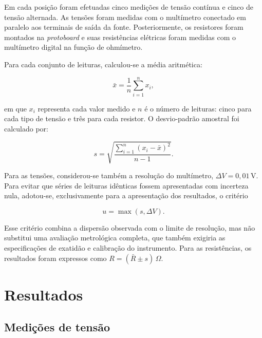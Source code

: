 \documentclass[a4paper,12pt]{article}
\begin{document}
Em cada posição foram efetuadas cinco medições de tensão contínua e cinco de
tensão alternada. As tensões foram medidas com o multímetro conectado em paralelo
aos terminais de saída da fonte. Posteriormente, os resistores foram montados na
\textit{protoboard} e suas resistências elétricas foram medidas com o multímetro
digital na função de ohmímetro.

Para cada conjunto de leituras, calculou-se a média aritmética:

\[
  \bar{x}=\frac{1}{n}\sum_{i=1}^{n}x_i,
\]

em que $x_i$ representa cada valor medido e $n$ é o número de leituras: cinco
para cada tipo de tensão e três para cada resistor. O desvio-padrão amostral foi
calculado por:

\[
  s=\sqrt{\frac{\sum_{i=1}^{n}(x_i-\bar{x})^2}{n-1}}.
\]

Para as tensões, considerou-se também a resolução do multímetro,
$\Delta V=0{,}01\,\mathrm{V}$. Para evitar que séries de leituras idênticas
fossem apresentadas com incerteza nula, adotou-se, exclusivamente para a
apresentação dos resultados, o critério

\[
  u=\max(s,\Delta V).
\]

Esse critério combina a dispersão observada com o limite de resolução, mas não
substitui uma avaliação metrológica completa, que também exigiria as
especificações de exatidão e calibração do instrumento. Para as resistências,
os resultados foram expressos como $R=(\bar R\pm s)\,\Omega$.

\section{Resultados}

\subsection{Medições de tensão}
\end{document}
